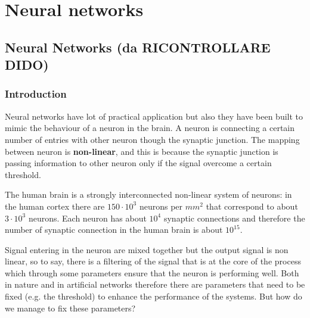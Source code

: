 \chapter{Neural networks}\label{chap:3}

\section{Neural Networks (da RICONTROLLARE DIDO)}
\subsection{Introduction}
Neural networks have lot of practical application but also they have been built to mimic the behaviour of a neuron in the brain.
A neuron is connecting a certain number of entries with other neuron though the synaptic junction.
The mapping between neuron is \textbf{non-linear}, and this is because the synaptic junction is passing information to other neuron only if the signal overcome a certain threshold.

The human brain is a strongly interconnected non-linear system of neurons:
in the human cortex there are $150\cdot10^3$ neurons per $mm^2$ that correspond to about $3 \cdot 10^3$ neurons. Each neuron has about $10^4$ synaptic connections and therefore the number of synaptic connection in the human brain is about $10^{15}$.
\begin{figure}[h!t]
\centering
{}
\caption{}
\end{figure}

Signal entering in the neuron are mixed together but the output signal is non linear, so to say, there is a filtering of the signal that is at the core of the process which through some parameters ensure that the neuron is performing well.
Both in nature and in artificial networks therefore there are parameters that need to be fixed (e.g. the threshold) to enhance the performance of the systems. But how do we manage to fix these parameters?
